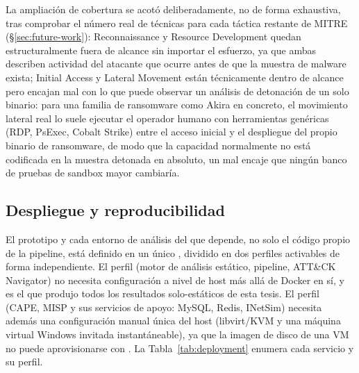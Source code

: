 La ampliaci\'on de cobertura se acot\'o deliberadamente, no de forma
exhaustiva, tras comprobar el n\'umero real de t\'ecnicas para cada
t\'actica restante de MITRE (\S\ref{sec:future-work}): Reconnaissance y
Resource Development quedan estructuralmente fuera de alcance sin
importar el esfuerzo, ya que ambas describen actividad del atacante
que ocurre antes de que la muestra de malware exista; Initial Access y
Lateral Movement est\'an t\'ecnicamente dentro de alcance pero encajan
mal con lo que puede observar un an\'alisis de detonaci\'on de un solo
binario: para una familia de ransomware como Akira en concreto, el
movimiento lateral real lo suele ejecutar el operador humano con
herramientas gen\'ericas (RDP, PsExec, Cobalt Strike) entre el acceso
inicial y el despliegue del propio binario de ransomware, de modo que
la capacidad normalmente no est\'a codificada en la muestra detonada
en absoluto, un mal encaje que ning\'un banco de pruebas de sandbox
mayor cambiar\'ia.

\subsection{Despliegue y reproducibilidad}
\label{sec:deployment}

El prototipo y cada entorno de an\'alisis del que depende, no solo el
c\'odigo propio de la pipeline, est\'a definido en un \'unico
, dividido en dos perfiles activables de forma
independiente. El perfil  (motor de an\'alisis est\'atico,
pipeline, ATT\&CK Navigator) no necesita configuraci\'on a nivel de
host m\'as all\'a de Docker en s\'i, y es el que produjo todos los
resultados solo-est\'aticos de esta tesis. El perfil 
(CAPE, MISP y sus servicios de apoyo: MySQL, Redis, INetSim) necesita
adem\'as una configuraci\'on manual \'unica del host (libvirt/KVM y una
m\'aquina virtual Windows invitada instant\'aneable), ya que la imagen
de disco de una VM no puede aprovisionarse con .
La Tabla~\ref{tab:deployment} enumera cada servicio y su perfil.

